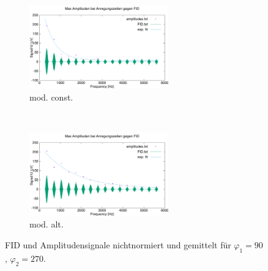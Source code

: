 \documentclass{article}
\begin{document}
        \begin{figure}[h]
            \centering
            \begin{subfigure}[b]{0.4\textwidth}
                \centering
                \includegraphics[width=6cm]{../Bilddateien/CPMG-90-270-constant-avg.png}
                \caption{mod. const.}
                \label{fig:CPMG-90-270-constant-avg}
            \end{subfigure}
            \
            \begin{subfigure}[b]{0.4\textwidth}
                \centering
                \includegraphics[width=6cm]{../Bilddateien/CPMG-90-270-alternating-avg.png}
                \caption{mod. alt.}
                \label{fig:CPMG-90-270-alternating-avg}
            \end{subfigure}
            \caption{FID und Amplitudensignale nichtnormiert und gemittelt für $\varphi_1 = 90$, $\varphi_2 = 270$.}
            \label{fig:CPMG-90-270-avg}
        \end{figure}
        
\end{document}

